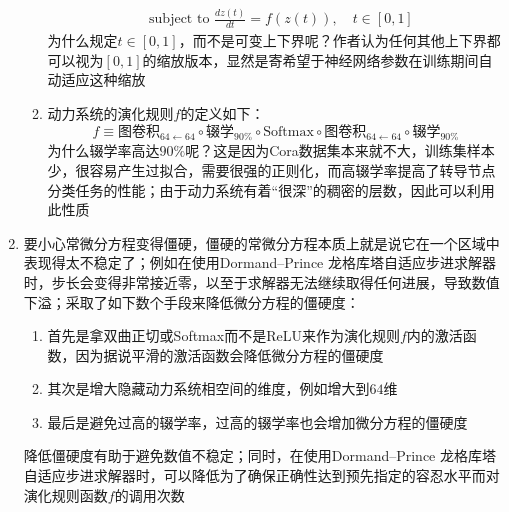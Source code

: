 \documentclass[11pt]{article}
\begin{document}
\begin{enumerate}
\begin{enumerate}
\[\begin{split}
&\text{subject to }\frac{dz(t)}{dt}=f(z(t)),\quad t\in[0,1]
\end{split}
\]为什么规定$t\in[0,1]$，而不是可变上下界呢？作者认为任何其他上下界都可以视为$[0,1]$的缩放版本，显然是寄希望于神经网络参数在训练期间自动适应这种缩放
\item 动力系统的演化规则$f$的定义如下：\[
f\equiv\text{图卷积}_{64\leftarrow64}\circ\text{辍学}_{90\%}\circ\text{Softmax}\circ\text{图卷积}_{64\leftarrow64}\circ\text{辍学}_{90\%}
\]为什么辍学率高达$90\%$呢？这是因为Cora数据集本来就不大，训练集样本少，很容易产生过拟合，需要很强的正则化，而高辍学率提高了转导节点分类任务的性能；由于动力系统有着``很深''的稠密的层数，因此可以利用此性质
\end{enumerate}
\item 要小心常微分方程变得僵硬，僵硬的常微分方程本质上就是说它在一个区域中表现得太不稳定了；例如在使用Dormand–Prince 龙格库塔自适应步进求解器时，步长会变得非常接近零，以至于求解器无法继续取得任何进展，导致数值下溢；\cite{poli2019graph}采取了如下数个手段来降低微分方程的僵硬度：
\begin{enumerate}
\item 首先是拿双曲正切或Softmax而不是ReLU来作为演化规则$f$内的激活函数，因为据说平滑的激活函数会降低微分方程的僵硬度
\item 其次是增大隐藏动力系统相空间的维度，例如增大到$64$维
\item 最后是避免过高的辍学率，过高的辍学率也会增加微分方程的僵硬度
\end{enumerate}
降低僵硬度有助于避免数值不稳定；同时，在使用Dormand–Prince 龙格库塔自适应步进求解器时，可以降低为了确保正确性达到预先指定的容忍水平而对演化规则函数$f$的调用次数
\end{enumerate}


\renewcommand\refname{参考文献}


\end{document}
